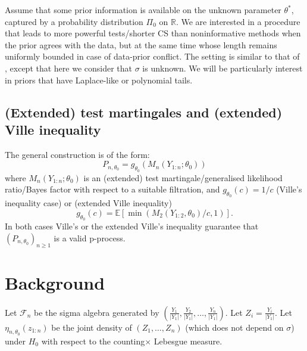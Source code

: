 \documentclass{article}%
\begin{document}
Assume that some prior information is available on the unknown parameter $\theta^*$, captured by a probability distribution $\Pi_0$ on $\mathbb R$. We are interested in a procedure that leads to more powerful tests/shorter CS than noninformative methods when the prior agrees with the data, but at the same time whose length remains uniformly bounded in case of data-prior conflict. The setting is similar to that of \cite{Cortinovis2025}, except that here we consider that $\sigma$ is unknown. We will be particularly interest in priors that have Laplace-like or polynomial tails.\medskip


\subsection{(Extended) test martingales and (extended) Ville inequality}

The general construction is of the form:
$$
P_{n,\theta_0} = g_{\theta_0}(M_n(Y_{1:n};\theta_0))
$$
where $M_n(Y_{1:n};\theta_0)$ is an (extended) test martingale/generalised likelihood ratio/Bayes factor with respect to a suitable filtration, and $g_{\theta_0}(c)=1/c$ (Ville's inequality case) or (extended Ville inequality)
$$
g_{\theta_0}(c)=\mathbb E\left[\min(M_2(Y_{1:2},\theta_0)/c,1)     \right].
$$
In both cases Ville's or the extended Ville's inequality guarantee that $(P_{n,\theta_0} )_{n\geq 1}$ is a valid p-process.


\section{Background}




Let $\mathcal F_n$ be the sigma algebra generated by $(\frac{Y_1}{|Y_1|},\frac{Y_2}{|Y_1|},\ldots,\frac{Y_n}{|Y_1|})$. Let $Z_i=\frac{Y_i}{|Y_1|}$. Let $\eta_{n,\theta_0}(z_{1:n})$ be the joint density of $(Z_{1},\ldots,Z_n)$  (which does not depend on $\sigma$) under $H_0$ with respect to the counting$\times$ Lebesgue measure.
\end{document}
